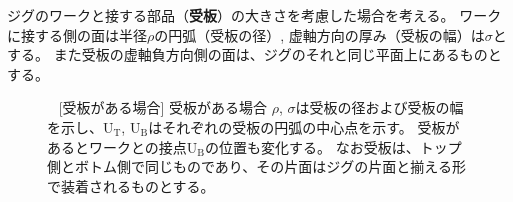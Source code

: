 \clearpage
ジグのワークと接する部品（\textbf{受板}）の大きさを考慮した場合を考える。
ワークに接する側の面は半径$\rho$の円弧（受板の径）, 虚軸方向の厚み（受板の幅）は$\sigma$とする。
また受板の虚軸負方向側の面は、ジグのそれと同じ平面上にあるものとする。
\begin{figure}[p]%
\begin{Figbox}[valign=top]%
%
\vfill~
[受板がある場合]{%
 受板がある場合\newline
 $\rho$, $\sigma$は受板の径および受板の幅を示し、U$_\mathrm T$, U$_\mathrm B$はそれぞれの受板の円弧の中心点を示す。
 受板があるとワークとの接点U$_\mathrm B$の位置も変化する。
 なお受板は、トップ側とボトム側で同じものであり、その片面はジグの片面と揃える形で装着されるものとする。
 \label{fig:mouldwithukeita}}
\end{Figbox}%
\end{figure}%
